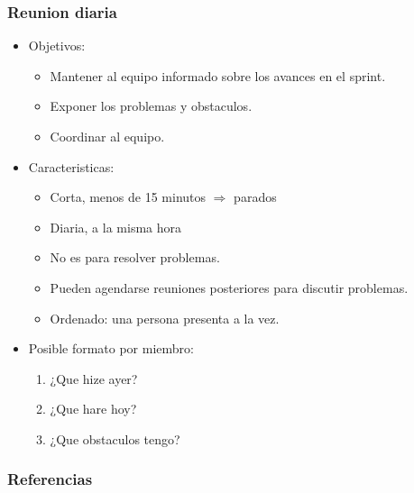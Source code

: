 \documentclass{beamer}
\begin{document}
\begin{frame}
    \frametitle{Reunion diaria}
    \begin{itemize}
        \item{Objetivos:
            \begin{itemize}
                \item{Mantener al equipo informado sobre los avances en el sprint.}
                \item{Exponer los problemas y obstaculos.}
                \item{Coordinar al equipo.}
            \end{itemize}
        }
        \item{Caracteristicas:
        \begin{itemize}
            \item{Corta, menos de 15 minutos $\Rightarrow$ parados}
            \item{Diaria, a la misma hora}
            \item{No es para resolver problemas.}
            \item{Pueden agendarse reuniones posteriores para discutir problemas.}
            \item{Ordenado: una persona presenta a la vez.}
        \end{itemize}
    }
    \item{Posible formato por miembro:
        \begin{enumerate}
            \item{¿Que hize ayer?}
            \item{¿Que hare hoy?}
            \item{¿Que obstaculos tengo?}
        \end{enumerate}
    }
    \end{itemize}
\end{frame}

\begin{frame}
\frametitle{Referencias}


\end{frame}
\end{document}
